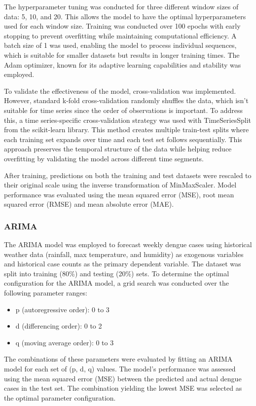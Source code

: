 The hyperparameter tuning was conducted for three different window sizes of data: 5, 10, and 20. This allows the model to have the optimal hyperparameters used for each window size. Training was conducted over 100 epochs with early stopping to prevent overfitting while maintaining computational efficiency. A batch size of 1 was used, enabling the model to process individual sequences, which is suitable for smaller datasets but results in longer training times. The Adam optimizer, known for its adaptive learning capabilities and stability was employed.

To validate the effectiveness of the model, cross-validation was implemented. However, standard k-fold cross-validation randomly shuffles the data, which isn't suitable for time series since the order of observations is important. To address this, a time series-specific cross-validation strategy was used with TimeSeriesSplit from the scikit-learn library. This method creates multiple train-test splits where each training set expands over time and each test set follows sequentially. This approach preserves the temporal structure of the data while helping reduce overfitting by validating the model across different time segments.

After training, predictions on both the training and test datasets were rescaled to their original scale using the inverse transformation of MinMaxScaler. Model performance was evaluated using the mean squared error (MSE), root mean squared error (RMSE) and mean absolute error (MAE).

\subsubsection{ARIMA}
The ARIMA model was employed to forecast weekly dengue cases using historical weather data (rainfall, max temperature, and humidity) as exogenous variables and historical case counts as the primary dependent variable.
The dataset was split into training (80\%) and testing (20\%) sets. To determine the optimal configuration for the ARIMA model, a grid search was conducted over the following parameter ranges:
\begin{itemize}
	\item p (autoregressive order): 0 to 3
	\item d (differencing order): 0 to 2
	\item q (moving average order): 0 to 3
\end{itemize}
The combinations of these parameters were evaluated by fitting an ARIMA model for each set of (p, d, q) values. The model's performance was assessed using the mean squared error (MSE) between the predicted and actual dengue cases in the test set. The combination yielding the lowest MSE was selected as the optimal parameter configuration.

